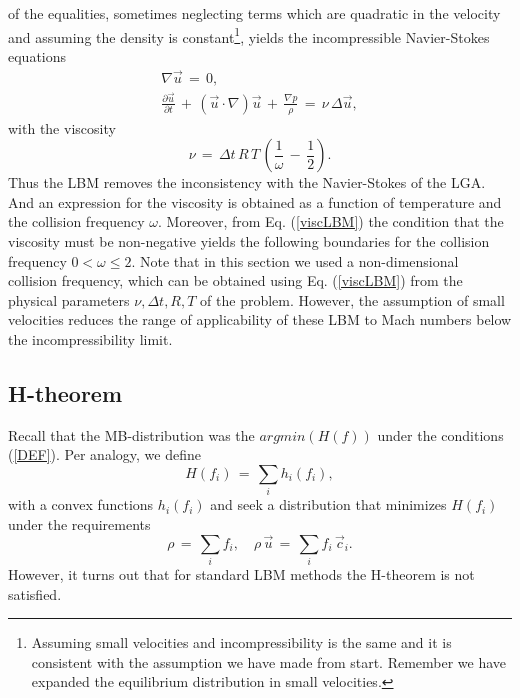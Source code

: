of the equalities, sometimes neglecting terms which are quadratic in the velocity and assuming the density is constant\footnote{Assuming small velocities and incompressibility is the same and it is consistent with the assumption we have made from start. Remember we have expanded the equilibrium distribution in small velocities.}, yields the incompressible Navier-Stokes equations
\begin{eqnarray}
	 \nabla \vec u \,= \, 0,\nonumber \\
	 \frac{\partial{\vec u}}{\partial{t}} \,+\, (\vec u \cdot \nabla ) \vec u \,+\, \frac{\nabla p}{\rho} \,= \,  \nu \, \Delta \vec u,\nonumber
\end{eqnarray}
with the viscosity 
\begin{equation}
  \nu \,=\,\Delta t \, R \, T \, \left( \frac{1}{\omega}\,-\,\frac{1}{2} \right).\label{viscLBM}
\end{equation}
Thus the LBM removes the inconsistency with the Navier-Stokes of the LGA. And an expression for the viscosity is obtained as a function of temperature and the collision frequency $\omega$. Moreover, from Eq. (\ref{viscLBM}) the condition that the viscosity must be non-negative yields the following boundaries for the collision frequency $0 < \omega \le 2$. Note that in this section we used a non-dimensional collision frequency, which can be obtained using Eq. (\ref{viscLBM}) from the physical parameters $\nu, \Delta t , R , T$ of the problem. However, the assumption of small velocities reduces the range of applicability of these LBM to Mach numbers below the incompressibility limit.

\subsection{H-theorem}

Recall that the MB-distribution was the $argmin\left(H(f)\right)$ under the conditions (\ref{DEF}). Per analogy, we define
\begin{equation}
 H(f_i) \,=\, \sum_i h_i(f_i), \nonumber
\end{equation}
with a convex functions $h_i(f_i)$ and seek a distribution that minimizes $H(f_i)$ under the requirements
\begin{equation}
 \rho \,=\, \sum_i f_i, \quad
 \rho \,\vec u\,=\, \sum_i f_i \, \vec c_i. \nonumber
\end{equation}
However, it turns out that for standard LBM methods the H-theorem is not satisfied.

